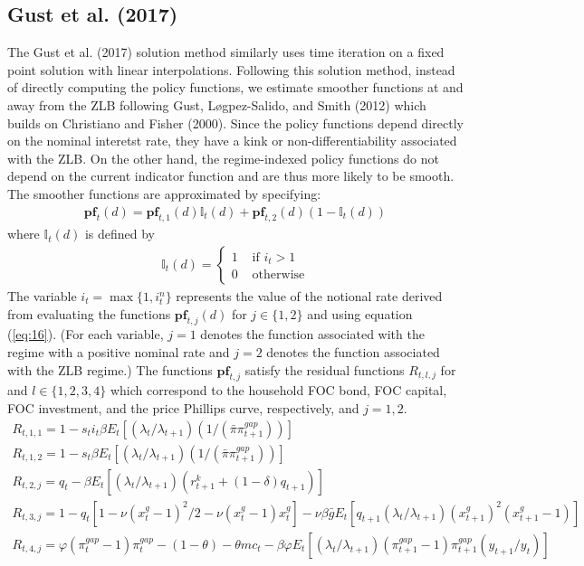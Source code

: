 \documentclass[12pt, final]{article}
\begin{document}
\subsection{Gust et al. (2017)}
The Gust et al. (2017) solution method similarly uses time iteration on a fixed point solution with linear interpolations. Following this solution method, instead of directly computing the policy functions, we estimate smoother functions at and away from the ZLB following Gust, L{\o g}pez-Salido, and Smith (2012) which builds on Christiano and Fisher (2000). Since the policy functions depend directly on the nominal interetst rate, they have a kink or non-differentiability associated with the ZLB.  On the other hand, the regime-indexed policy functions do not depend on the current indicator function and are thus more likely to be smooth. The smoother functions are approximated by specifying:
\begin{gather}
  \textbf{pf}_t(d) = \textbf{pf}_{t,1}(d)\mathds{I}_t(d) + \textbf{pf}_{t,2}(d)(1-\mathds{I}_t(d))
\end{gather}
where $\mathds{I}_t(d)$ is defined by
\begin{gather}
  \mathds{I}_t(d) = 
\begin{cases}
     1 &\text{ if } i_t > 1\\
     0 &\text{ otherwise}
\end{cases}
\end{gather}
The variable $i_t=\max\{1,i_t^n\}$ represents the value of the notional rate derived from evaluating the functions $\textbf{pf}_{t,j}(d)$ for $j \in \{1,2\}$ and using equation (\ref{eq:16}). (For each variable, $j=1$ denotes the function associated with the regime with a positive nominal rate and $j=2$ denotes the function associated with the ZLB regime.) %
The functions $\textbf{pf}_{t,j}$ satisfy the residual functions $R_{t,l,j}$ for and $l \in \{1,2,3,4\}$ which correspond to the household FOC bond, FOC capital, FOC investment, and the price Phillips curve, respectively, and $j = 1,2$.
\begin{gather}
  R_{t,1,1} = 1 - s_ti_t\beta E_t[(\lambda_t/\lambda_{t+1})(1/(\bar{\pi}\pi_{t+1}^{gap}))]\\
  R_{t,1,2} = 1 - s_t\beta E_t[(\lambda_t/\lambda_{t+1})(1/(\bar{\pi}\pi_{t+1}^{gap}))]\\
  R_{t,2,j} = q_t - \beta E_t[(\lambda_t/\lambda_{t+1})(r^k_{t+1}+(1-\delta)q_{t+1})]\\
  R_{t,3,j} = 1 - q_t[1-\nu(x^g_t-1)^2/2 - \nu(x_t^g-1)x_t^g] - \nu\beta\bar{g}E_t[q_{t+1}(\lambda_t/\lambda_{t+1})(x^g_{t+1})^2(x^g_{t+1}-1)]\\
  R_{t,4,j} = \varphi(\pi_t^{gap}-1)\pi_t^{gap} - (1-\theta) - \theta mc_t - \beta\varphi E_t[(\lambda_t/\lambda_{t+1})(\pi_{t+1}^{gap}-1)\pi_{t+1}^{gap}(y_{t+1}/y_t)]
  \end{gather}
\end{document}
